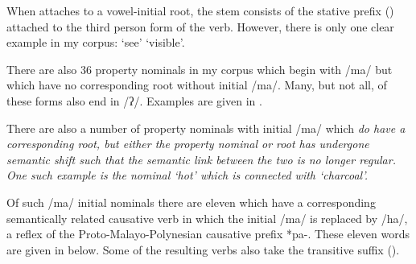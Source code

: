 When  attaches to a vowel-initial root,
the stem consists of the stative prefix  ()
attached to the third person form of the verb.
However, there is only one clear example in my corpus:
 `see' {\ra}  `visible'.

There are also 36 property nominals in my corpus which
begin with /ma/ but which have no corresponding root without initial /ma/.
Many, but not all, of these forms also end in /ʔ/.
Examples are given in .

\begin{exe}
	\label{ex:FroAdjPre}
\end{exe}

There are also a number of property nominals with initial /ma/
which \it{do} have a corresponding root,
but either the property nominal or root has undergone semantic shift
such that the semantic link between the two is no longer regular.
One such example is the nominal  `hot'
which is connected with  `charcoal'.

Of such /ma/ initial nominals there are eleven which have a corresponding 
semantically related causative verb in which the initial /ma/ is replaced by /ha/,
a reflex of the Proto-Malayo-Polynesian causative prefix *pa-.
These eleven words are given in  below.
Some of the resulting verbs also take the transitive suffix  ().

